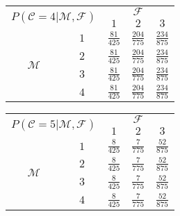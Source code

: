 \documentclass[preview]{standalone}
\newcommand{\M}{\mathcal{M}}
\newcommand{\F}{\mathcal{F}}
\newcommand{\C}{\mathcal{C}}
\begin{document}
	\begin{tabular}{|c|c|c|c|c|}
		\hline
		\multicolumn{2}{|c|}{\multirow{2}{*}{$P(\C = 4|\M,\F)$}} &                \multicolumn{3}{c|}{$\F$}                 \\ \cline{3-5}
		\multicolumn{2}{|c|}{}                                   &       $1$        &        $2$        &        $3$        \\ \hline
		\multirow{4}{*}{$\M$} &               $1$                & $\frac{81}{425}$ & $\frac{204}{775}$ & $\frac{234}{875}$ \\ \cline{2-5}
		                      &               $2$                & $\frac{81}{425}$ & $\frac{204}{775}$ & $\frac{234}{875}$ \\ \cline{2-5}
		                      &               $3$                & $\frac{81}{425}$ & $\frac{204}{775}$ & $\frac{234}{875}$ \\ \cline{2-5}
		                      &               $4$                & $\frac{81}{425}$ & $\frac{204}{775}$ & $\frac{234}{875}$ \\ \hline
	\end{tabular}
	\hspace{0.5\mytextsize}
	\begin{tabular}{|c|c|c|c|c|}
		\hline
		\multicolumn{2}{|c|}{\multirow{2}{*}{$P(\C = 5|\M,\F)$}} &              \multicolumn{3}{c|}{$\F$}               \\ \cline{3-5}
		\multicolumn{2}{|c|}{}                                   &       $1$       &       $2$       &       $3$        \\ \hline
		\multirow{4}{*}{$\M$} &               $1$                & $\frac{8}{425}$ & $\frac{7}{775}$ & $\frac{52}{875}$ \\ \cline{2-5}
		                      &               $2$                & $\frac{8}{425}$ & $\frac{7}{775}$ & $\frac{52}{875}$ \\ \cline{2-5}
		                      &               $3$                & $\frac{8}{425}$ & $\frac{7}{775}$ & $\frac{52}{875}$ \\ \cline{2-5}
		                      &               $4$                & $\frac{8}{425}$ & $\frac{7}{775}$ & $\frac{52}{875}$ \\ \hline
	\end{tabular}
\end{document}
